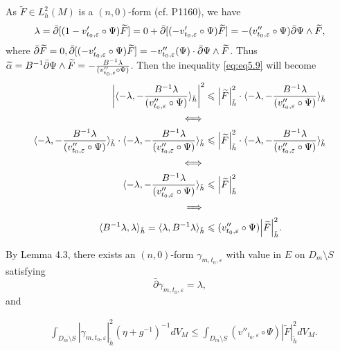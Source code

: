 \begin{remark}
  As $\widetilde{F}\in L_h^2(M)$ is a $(n,0)$-form (cf. P1160), we have $$\lambda=\bar\partial [(1-v_{t_0,\varepsilon}'\circ\Psi)\widetilde{F}]=0+\bar\partial[(-v_{t_0,\varepsilon}'\circ\Psi)\widetilde{F}]=-(v_{t_0,\varepsilon}''\circ\Psi)\bar\partial\Psi\wedge\widetilde{F},$$ 
  where $\bar\partial \widetilde{F}=0, \bar\partial[(-v_{t_0,\varepsilon}'\circ\Psi)\widetilde{F}]=-v_{t_0,\varepsilon}''(\Psi)\cdot \bar\partial\Psi\wedge \widetilde{F}$.
  Thus $\widetilde{\alpha}=B^{-1}\bar\partial \Psi\wedge \widetilde{F}=-\frac{B^{-1}\lambda}{(v_{t_0,\varepsilon}''\circ\Psi)}$. Then the inequality \eqref{eq:eq5.9} will become
  \begin{align*}
\abs{\langle -\lambda,-\frac{B^{-1}\lambda}{(v_{t_0,\varepsilon}''\circ\Psi)}\rangle_{\tilde{h}}}^2 &\leqslant \abs{\widetilde{F}}^2_{\tilde{h}}\cdot \langle -\lambda,-\frac{B^{-1}\lambda}{(v_{t_0,\varepsilon}''\circ\Psi)}\rangle_{\tilde{h}}\\ 
\iff\\
\langle -\lambda,-\frac{B^{-1}\lambda}{(v_{t_0,\varepsilon}''\circ\Psi)}\rangle_{\tilde{h}}\cdot \langle -\lambda,-\frac{B^{-1}\lambda}{(v_{t_0,\varepsilon}''\circ\Psi)}\rangle_{\tilde{h}} & \leqslant \abs{\widetilde{F}}^2_{\tilde{h}}\cdot \langle -\lambda,-\frac{B^{-1}\lambda}{(v_{t_0,\varepsilon}''\circ\Psi)}\rangle_{\tilde{h}}\\ 
\iff\\ 
\langle -\lambda,-\frac{B^{-1}\lambda}{(v_{t_0,\varepsilon}''\circ\Psi)}\rangle_{\tilde{h}}& \leqslant \abs{\widetilde{F}}^2_{\tilde{h}}\\ 
\implies\\ 
\langle B^{-1}\lambda,\lambda\rangle_{\tilde{h}}=\langle \lambda,B^{-1}\lambda\rangle_{\tilde{h}}& \leqslant (v_{t_0,\varepsilon}''\circ\Psi)\abs{\widetilde{F}}^2_{\tilde{h}}.
  \end{align*}
\end{remark}

By Lemma 4.3, there exists an $(n,0)$-form
$\gamma_{m,t_0,\varepsilon}$ with value in $E$ on $D_{m}\setminus S$
satisfying
$$\bar{\partial}\gamma_{m,t_0,\varepsilon}=\lambda,$$
and

\begin{equation}
 \label{equ:smooth.vector3.2}
 \begin{split}
 &\int_{ D_m\setminus S}|\gamma_{m,t_0,\varepsilon}|^{2}_{\tilde{h}}(\eta+g^{-1})^{-1}dV_{M}
  \leq\int_{D_m\setminus S}(v''_{t_0,\varepsilon}\circ{\Psi})| \tilde{F}|^2_{\tilde{h}}dV_M.
  \end{split}
\end{equation}

